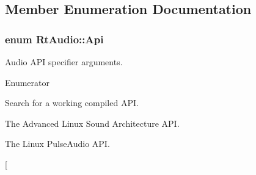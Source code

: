 \subsection{Member Enumeration Documentation}
\subsubsection[{Api}]{\setlength{\rightskip}{0pt plus 5cm}enum {\bf Rt\+Audio\+::\+Api}}\hypertarget{class_rt_audio_ac9b6f625da88249d08a8409a9db0d849}{}\label{class_rt_audio_ac9b6f625da88249d08a8409a9db0d849}


Audio A\+PI specifier arguments. 

\begin{Desc}
\item[Enumerator]\par
\begin{description}
\item[{\em 
U\+N\+S\+P\+E\+C\+I\+F\+I\+ED\hypertarget{class_rt_audio_ac9b6f625da88249d08a8409a9db0d849aa49af3ac767106158bc6cad74fb214ae}{}\label{class_rt_audio_ac9b6f625da88249d08a8409a9db0d849aa49af3ac767106158bc6cad74fb214ae}
}]Search for a working compiled A\+PI. \item[{\em 
L\+I\+N\+U\+X\+\_\+\+A\+L\+SA\hypertarget{class_rt_audio_ac9b6f625da88249d08a8409a9db0d849aa7a2ba095c2806caa893b6fb8fc3a1a8}{}\label{class_rt_audio_ac9b6f625da88249d08a8409a9db0d849aa7a2ba095c2806caa893b6fb8fc3a1a8}
}]The Advanced Linux Sound Architecture A\+PI. \item[{\em 
L\+I\+N\+U\+X\+\_\+\+P\+U\+L\+SE\hypertarget{class_rt_audio_ac9b6f625da88249d08a8409a9db0d849adc17dff310e85d303fb326c837c08d77}{}\label{class_rt_audio_ac9b6f625da88249d08a8409a9db0d849adc17dff310e85d303fb326c837c08d77}
}]The Linux Pulse\+Audio A\+PI. \item[{\em 
}
\end{description}
\end{Desc}
